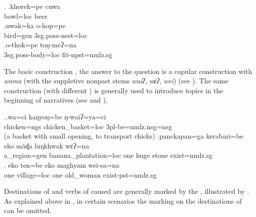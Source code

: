 \ex. \ag.khorek=pe cuwa\\
		bowl{\sc =loc} beer	\\
	 \bg.nwak=ka o-hop=pe\\
		bird{\sc =gen} {\sc 3sg.poss}-nest{\sc =loc}	\\
		\bg.o-thok=pe toŋ-meʔ=na\\
		{\sc 3sg.poss}-body{\sc =loc} fit{\sc [3sg]-npst=nmlz.sg}\\
	
The basic  construction \cite[15]{Levinsonetal2006_Grammars}, the answer to the question  is a copular construction with \emph{wama} (with the suppletive nonpast stems \emph{waiʔ}, \emph{wɛʔ}, \emph{wei})  (see \Next[a]). The same construction (with different ) is generally used to introduce topics in the beginning of narratives (see \Next[b] and \Next[c]).


\ex.\ag.wa=ci kaŋyoŋ=be ŋ-waiʔ=ya=ci\\
chicken{\sc =ngs} chicken\_basket{\sc =loc} {\sc 3pl-}be{\sc [npst]=nmlz.nsg=nsg}\\
 (a basket with small opening, to transport chicks)
\bg.panckapan=ga    kerabari=be        eko mãɖa luŋkhwak wɛʔ=na\\
a\_region{\sc =gen} banana\_plantation{\sc =loc} one huge stone exist{\sc [3sg;npst]=nmlz.sg}\\
  
\bg. eko ten=be        eko maghyam  wei-sa=na \\
one village{\sc =loc} one old\_woman exist{\sc [3sg;npst]-pst=nmlz.sg}\\
 
	
Destinations of  and verbs of caused  are generally marked by the , illustrated by \Next. As explained above in , in certain scenarios the  marking on the destinations of  can be omitted. 

